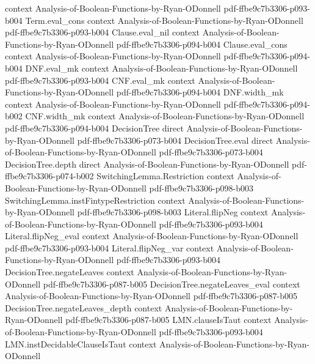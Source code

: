 \begin{theorem}
  {context}
  {Analysis-of-Boolean-Functions-by-Ryan-ODonnell}
  {pdf-ffbe9c7b3306-p093-b004}
\proofstep
  {Term.eval_cons}
  {context}
  {Analysis-of-Boolean-Functions-by-Ryan-ODonnell}
  {pdf-ffbe9c7b3306-p093-b004}
\proofstep
  {Clause.eval_nil}
  {context}
  {Analysis-of-Boolean-Functions-by-Ryan-ODonnell}
  {pdf-ffbe9c7b3306-p094-b004}
\proofstep
  {Clause.eval_cons}
  {context}
  {Analysis-of-Boolean-Functions-by-Ryan-ODonnell}
  {pdf-ffbe9c7b3306-p094-b004}
\proofstep
  {DNF.eval_mk}
  {context}
  {Analysis-of-Boolean-Functions-by-Ryan-ODonnell}
  {pdf-ffbe9c7b3306-p093-b004}
\proofstep
  {CNF.eval_mk}
  {context}
  {Analysis-of-Boolean-Functions-by-Ryan-ODonnell}
  {pdf-ffbe9c7b3306-p094-b004}
\proofstep
  {DNF.width_mk}
  {context}
  {Analysis-of-Boolean-Functions-by-Ryan-ODonnell}
  {pdf-ffbe9c7b3306-p094-b002}
\proofstep
  {CNF.width_mk}
  {context}
  {Analysis-of-Boolean-Functions-by-Ryan-ODonnell}
  {pdf-ffbe9c7b3306-p094-b004}
\proofstep
  {DecisionTree}
  {direct}
  {Analysis-of-Boolean-Functions-by-Ryan-ODonnell}
  {pdf-ffbe9c7b3306-p073-b004}
\proofstep
  {DecisionTree.eval}
  {direct}
  {Analysis-of-Boolean-Functions-by-Ryan-ODonnell}
  {pdf-ffbe9c7b3306-p073-b004}
\proofstep
  {DecisionTree.depth}
  {direct}
  {Analysis-of-Boolean-Functions-by-Ryan-ODonnell}
  {pdf-ffbe9c7b3306-p074-b002}
\proofstep
  {SwitchingLemma.Restriction}
  {context}
  {Analysis-of-Boolean-Functions-by-Ryan-ODonnell}
  {pdf-ffbe9c7b3306-p098-b003}
\proofstep
  {SwitchingLemma.instFintypeRestriction}
  {context}
  {Analysis-of-Boolean-Functions-by-Ryan-ODonnell}
  {pdf-ffbe9c7b3306-p098-b003}
\proofstep
  {Literal.flipNeg}
  {context}
  {Analysis-of-Boolean-Functions-by-Ryan-ODonnell}
  {pdf-ffbe9c7b3306-p093-b004}
\proofstep
  {Literal.flipNeg_eval}
  {context}
  {Analysis-of-Boolean-Functions-by-Ryan-ODonnell}
  {pdf-ffbe9c7b3306-p093-b004}
\proofstep
  {Literal.flipNeg_var}
  {context}
  {Analysis-of-Boolean-Functions-by-Ryan-ODonnell}
  {pdf-ffbe9c7b3306-p093-b004}
\proofstep
  {DecisionTree.negateLeaves}
  {context}
  {Analysis-of-Boolean-Functions-by-Ryan-ODonnell}
  {pdf-ffbe9c7b3306-p087-b005}
\proofstep
  {DecisionTree.negateLeaves_eval}
  {context}
  {Analysis-of-Boolean-Functions-by-Ryan-ODonnell}
  {pdf-ffbe9c7b3306-p087-b005}
\proofstep
  {DecisionTree.negateLeaves_depth}
  {context}
  {Analysis-of-Boolean-Functions-by-Ryan-ODonnell}
  {pdf-ffbe9c7b3306-p087-b005}
\proofstep
  {LMN.clauseIsTaut}
  {context}
  {Analysis-of-Boolean-Functions-by-Ryan-ODonnell}
  {pdf-ffbe9c7b3306-p093-b004}
\proofstep
  {LMN.instDecidableClauseIsTaut}
  {context}
  {Analysis-of-Boolean-Functions-by-Ryan-ODonnell}

\end{theorem}
